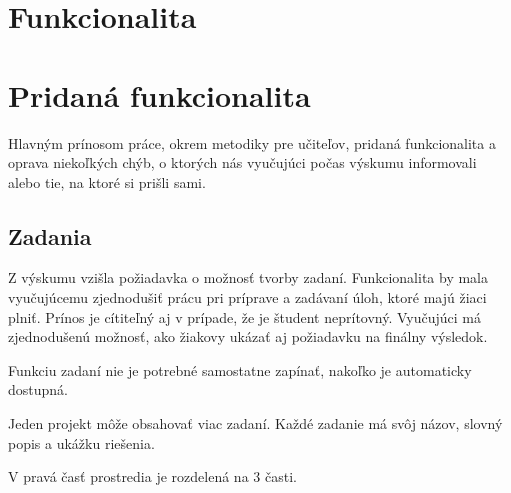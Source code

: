 
\section{Funkcionalita}
\section{Pridaná funkcionalita}

Hlavným prínosom práce, okrem metodiky pre učiteľov, pridaná funkcionalita a oprava niekoľkých chýb, o ktorých nás vyučujúci počas výskumu informovali alebo tie, na ktoré si prišli sami. 

\subsection{Zadania}

Z výskumu vzišla požiadavka o možnosť tvorby zadaní.
Funkcionalita by mala vyučujúcemu zjednodušiť prácu pri príprave a zadávaní úloh, ktoré majú žiaci plniť.
Prínos je cítiteľný aj v prípade, že je študent neprítovný.
Vyučujúci má zjednodušenú možnosť, ako žiakovy ukázať aj požiadavku na finálny výsledok.

Funkciu zadaní nie je potrebné samostatne zapínať, nakoľko je automaticky dostupná.

Jeden projekt môže obsahovať viac zadaní.
Každé zadanie má svôj názov, slovný popis a ukážku riešenia.

V pravá časť prostredia je rozdelená na 3 časti.

